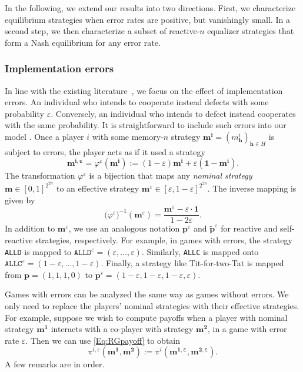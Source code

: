 \documentclass[9pt,twoside,lineno]{pnas-new}
\theoremstyle{plainCl1}
\theoremstyle{plainCl2}
\def\allc{\texttt{ALLC}}
\def\alld{\texttt{ALLD}}
\begin{document}
In the following, we extend our results into two directions. 
First, we characterize equilibrium strategies when error rates are positive, but vanishingly small. 
In a second step, we then characterize a subset of reactive-$n$ equalizer strategies that form a Nash equilibrium for any error rate. 

\subsubsection*{Implementation errors}
In line with the existing literature~\cite{axelrod:book:1984,nowak:book:2006,sigmund2010,hilbe:Nature:2018}, we focus on the effect of implementation errors. 
An individual who intends to cooperate instead defects with some probability $\varepsilon$. Conversely, an individual who intends to defect instead cooperates with the same probability. 
It is straightforward to include such errors into our model \citep[see also Ref.][]{park:NComms:2022}. 
Once a player $i$ with some memory-$n$ strategy \(\mathbf{m^i} \!=\! (m^i_\mathbf{h})_{\mathbf{h}\in H}\) is subject to errors, the player acts as if it used a strategy
\begin{equation}
\mathbf{m^{i,\varepsilon}} = \varphi^\varepsilon(\mathbf{m^i}) := (1\!-\!\varepsilon)\mathbf{m^i} + \varepsilon (\mathbf{1}-\mathbf{m^i}). 
\end{equation}
The transformation $\varphi^\varepsilon$ is a bijection that maps any {\it nominal strategy} $\mathbf{m} \in [0,1]^{2^{2n}}$ to an effective strategy $\mathbf{m}^\varepsilon \in [\varepsilon,1\!-\!\varepsilon]^{2^{2n}}$. The inverse mapping is given by
\begin{equation} \label{Eq:Phi_inverse}
\big(\varphi^\varepsilon\big)^{-1}(\mathbf{m}^\varepsilon) = \frac{\mathbf{m}^\varepsilon - \varepsilon\cdot \mathbf{1}}{1\!-\!2\varepsilon}. 
\end{equation}
In addition to $\mathbf{m}^\varepsilon$, we use an analogous notation $\mathbf{p}^\varepsilon$ and $\mathbf{\tilde p}^\varepsilon$ for reactive and self-reactive strategies, respectively. 
For example, in games with errors, the strategy \alld{} is mapped to $\alld^\varepsilon = (\varepsilon,\ldots,\varepsilon)$. Similarly, \allc{} is mapped onto $\allc^\varepsilon = (1\!-\!\varepsilon,\ldots,1\!-\!\varepsilon)$. Finally, a strategy like Tit-for-two-Tat is mapped from $\mathbf{p}=(1,1,1,0)$ to $\mathbf{p}^\varepsilon = (1\!-\!\varepsilon,1\!-\!\varepsilon,1\!-\!\varepsilon,\varepsilon)$. 

Games with errors can be analyzed the same way as games without errors.
We only need to replace the players' nominal strategies with their effective strategies. 
For example, suppose we wish to compute payoffs when a player with nominal strategy $\mathbf{m^1}$ interacts with a co-player with strategy $\mathbf{m^2}$, in a game with error rate $\varepsilon$. Then we can use \eqref{Eq:RGpayoff} to obtain
\begin{equation}
\pi^{i,\varepsilon}(\mathbf{m^1},\mathbf{m^2}) := \pi^i(\mathbf{m^{1,\varepsilon}},\mathbf{m^{2,\varepsilon}}). 
\end{equation}
A few remarks are in order. 
\end{document}
